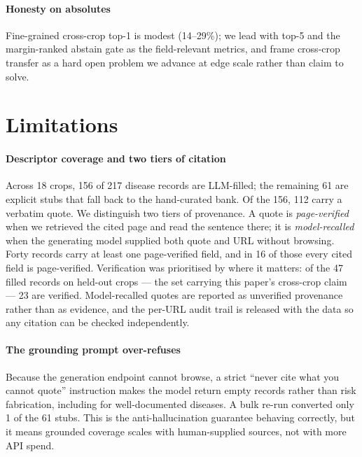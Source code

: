 \documentclass[a4paper,fleqn]{cas-dc}
\begin{document}
\paragraph{Honesty on absolutes} Fine-grained cross-crop top-1 is modest (14--29\%); we lead with top-5
and the margin-ranked abstain gate as the field-relevant metrics, and frame cross-crop transfer as a hard
open problem we advance at edge scale rather than claim to solve.

\section{Limitations}
\label{sec:limits}

\paragraph{Descriptor coverage and two tiers of citation} Across 18 crops, 156 of 217 disease records
are LLM-filled; the remaining 61 are explicit stubs that fall back to the hand-curated bank. Of the
156, 112 carry a verbatim quote. We distinguish two tiers of provenance. A quote is
\emph{page-verified} when we retrieved the cited page and read the sentence there; it is
\emph{model-recalled} when the generating model supplied both quote and URL without browsing. Forty
records carry at least one page-verified field, and in 16 of those every cited field is
page-verified. Verification was prioritised by where it matters: of the 47 filled records on
held-out crops --- the set carrying this paper's cross-crop claim --- 23 are verified. Model-recalled
quotes are reported as unverified provenance rather than as evidence, and the per-URL audit trail is
released with the data so any citation can be checked independently.

\paragraph{The grounding prompt over-refuses} Because the generation endpoint cannot browse, a strict
``never cite what you cannot quote'' instruction makes the model return empty records rather than risk
fabrication, including for well-documented diseases. A bulk re-run converted only 1 of the 61 stubs. This
is the anti-hallucination guarantee behaving correctly, but it means grounded coverage scales with
human-supplied sources, not with more API spend.
\end{document}
